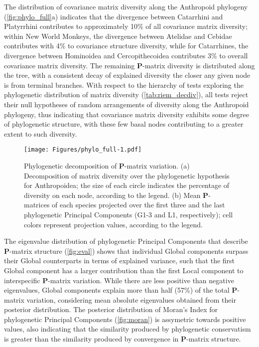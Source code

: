 \documentclass[12pt,twoside]{report}
\begin{document}
The distribution of covariance matrix diversity along the Anthropoid
phylogeny (\autoref{fig:phylo_full}a) indicates that the divergence
between Catarrhini and Platyrrhini contributes to approximately 10\% of
all covariance matrix diversity; within New World Monkeys, the
divergence between Atelidae and Cebidae contributes with 4\% to
covariance structure diversity, while for Catarrhines, the divergence
between Hominoidea and Cercopithecoidea contributes 3\% to overall
covariance matrix diversity. The remaining $\mathbf{P}$-matrix diversity
is distributed along the tree, with a consistent decay of explained
diversity the closer any given node is from terminal branches. With
respect to the hierarchy of tests exploring the phylogenetic
distribution of matrix diversity (\autoref{tab:riem_decdiv}), all tests
reject their null hypotheses of random arrangements of diversity along
the Anthropoid phylogeny, thus indicating that covariance matrix
diversity exhibits some degree of phylogenetic structure, with these few
basal nodes contributing to a greater extent to such diversity.



\begin{figure}[htbp]
\centering
\texttt{[image: Figures/phylo\_full-1.pdf]}
\caption{Phylogenetic decomposition of $\mathbf{P}$-matrix variation.
(a) Decomposition of matrix diversity over the phylogenetic hypothesis
for Anthropoidea; the size of each circle indicates the percentage of
diversity on each node, according to the legend. (b) Mean
$\mathbf{P}$-matrices of each species projected over the first three and
the last phylogenetic Principal Components (G1-3 and L1, respectively);
cell colors represent projection values, according to the legend.
\label{fig:phylo_full}}
\end{figure}

The eigenvalue distribution of phylogenetic Principal Components that
describe $\mathbf{P}$-matrix structure (\autoref{fig:eval}) shows that
individual Global components surpass their Global counterparts in terms
of explained variance, such that the first Global component has a larger
contribution than the first Local component to interspecific
$\mathbf{P}$-matrix variation. While there are less positive than
negative eigenvalues, Global components explain more than half (57\%) of
the total $\mathbf{P}$-matrix variation, considering mean absolute
eigenvalues obtained from their posterior distribution. The posterior
distribution of Moran's Index for phylogenetic Principal Components
(\autoref{fig:moran}) is assymetric towards positive values, also
indicating that the similarity produced by phylogenetic conservatism is
greater than the similarity produced by convergence in
$\mathbf{P}$-matrix structure.
\end{document}
